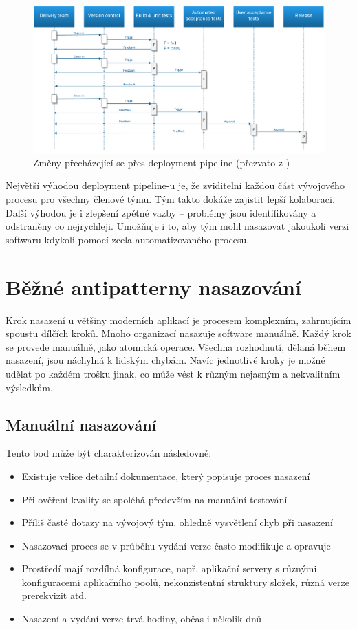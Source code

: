 \begin{figure}[]
  \centering
  \includegraphics[width=15cm]{fig/pipeline_changes.png}
  \caption{Změny přecházející se přes deployment pipeline (přezvato z \cite{ContDelivery})}
  \label{fig:pipeline_commit}
\end{figure}

Největší výhodou deployment pipeline-u je, že zviditelní každou část vývojového procesu pro všechny členové týmu. Tým takto dokáže zajistit lepší kolaboraci. Další výhodou je i zlepšení zpětné vazby -- problémy jsou identifikovány a odstraněny co nejrychleji. Umožňuje i to, aby tým mohl nasazovat jakoukoli verzi softwaru kdykoli pomocí zcela automatizovaného procesu.

\section{Běžné antipatterny nasazování}
Krok nasazení u většiny moderních aplikací je procesem komplexním, zahrnujícím spoustu dílčích kroků. Mnoho organizací nasazuje software manuálně. Každý krok se provede manuálně, jako atomická operace. Všechna rozhodnutí, dělaná během nasazení, jsou náchylná k lidským chybám. Navíc jednotlivé kroky je možné udělat po každém trošku jinak, co může vést k různým nejasným a nekvalitním výsledkům.

\subsection{Manuální nasazování}
Tento bod může být charakterizován následovně:

\begin{itemize}
  \item Existuje velice detailní dokumentace, který popisuje proces nasazení
  \item Při ověření kvality se spoléhá především na manuální testování 
  \item Příliš časté dotazy na vývojový tým, ohledně vysvětlení chyb při nasazení
  \item Nasazovací proces se v průběhu vydání verze často modifikuje a opravuje
  \item Prostředí mají rozdílná konfigurace, např. aplikační servery s různými konfiguracemi aplikačního poolů, nekonzistentní struktury složek, různá verze prerekvizit atd.
  \item Nasazení a vydání verze trvá hodiny, občas i několik dnů
\end{itemize}

